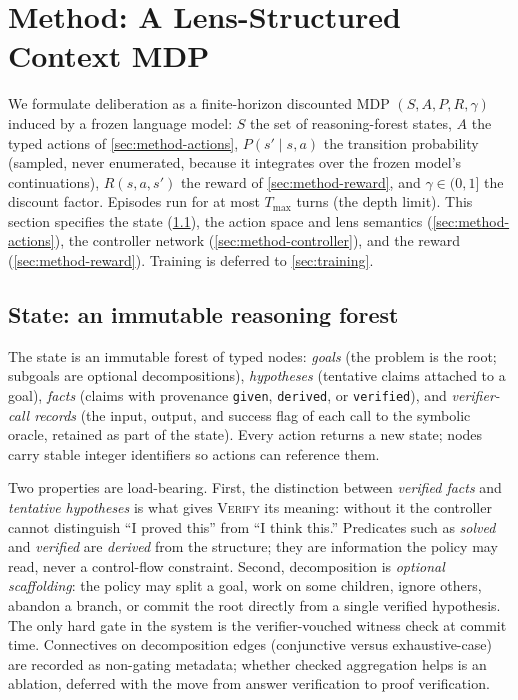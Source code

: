 \section{Method: A Lens-Structured Context MDP}
\label{sec:method}

We formulate deliberation as a finite-horizon discounted MDP
$(S, A, P, R, \gamma)$ induced by a frozen language model: $S$ the set of
reasoning-forest states, $A$ the typed actions of
\cref{sec:method-actions}, $P(s' \mid s, a)$ the transition probability
(sampled, never enumerated, because it integrates over the frozen model's
continuations), $R(s, a, s')$ the reward of \cref{sec:method-reward}, and
$\gamma \in (0, 1]$ the discount factor. Episodes run for at most
$T_{\max}$ turns (the depth limit). This section
specifies the state (\cref{sec:method-state}), the action space and lens
semantics (\cref{sec:method-actions}), the controller network
(\cref{sec:method-controller}), and the reward (\cref{sec:method-reward}).
Training is deferred to \cref{sec:training}.



\subsection{State: an immutable reasoning forest}
\label{sec:method-state}

The state is an immutable forest of typed nodes: \emph{goals} (the problem
is the root; subgoals are optional decompositions), \emph{hypotheses}
(tentative claims attached to a goal), \emph{facts} (claims with provenance
\texttt{given}, \texttt{derived}, or \texttt{verified}), and
\emph{verifier-call records} (the input, output, and success flag of each
call to the symbolic oracle, retained as part of the state). Every action
returns a new state; nodes carry stable integer identifiers so actions can
reference them.

Two properties are load-bearing. First, the distinction between
\emph{verified facts} and \emph{tentative hypotheses} is what gives
\textsc{Verify} its meaning: without it the controller cannot distinguish
``I proved this'' from ``I think this.'' Predicates such as
\textit{solved} and \textit{verified} are \emph{derived} from the
structure; they are information the policy may read, never a control-flow
constraint. Second, decomposition is \emph{optional scaffolding}: the policy
may split a goal, work on some children, ignore others, abandon a branch, or
commit the root directly from a single verified hypothesis. The only hard
gate in the system is the verifier-vouched witness check at commit time.
Connectives on decomposition edges (conjunctive versus exhaustive-case) are
recorded as non-gating metadata; whether checked aggregation helps is an
ablation, deferred with the move from answer verification to proof
verification.

